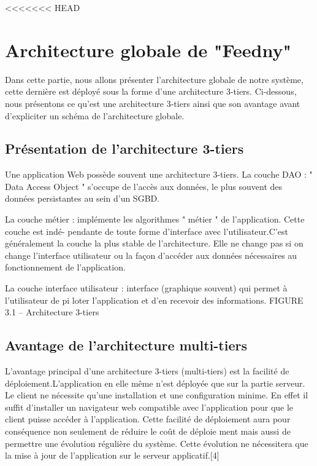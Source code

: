 <<<<<<< HEAD





\section{Architecture globale de "Feedny"}
Dans cette partie, nous allons présenter l'architecture globale de notre système, cette dernière est déployé sous la forme d'une architecture 3-tiers. Ci-dessous, nous présentons ce qu'est une architecture 3-tiers ainsi que son avantage avant d'expliciter un schéma de l'architecture globale.
\subsection{Présentation de l'architecture 3-tiers}

Une application Web possède souvent une architecture 3-tiers.
La couche DAO : " Data Access Object " s'occupe de l'accès aux données, le plus souvent des
données persistantes au sein d'un SGBD.

La couche métier : implémente les algorithmes " métier " de l'application. Cette couche est indé-
pendante de toute forme d'interface avec l'utilisateur.C'est généralement la couche la plus
stable de l'architecture. Elle ne change pas si on change l'interface utilisateur ou la façon
d'accéder aux données nécessaires au fonctionnement de l'application.

La couche interface utilisateur : interface (graphique souvent) qui permet à l'utilisateur de pi
loter l'application et d'en recevoir des informations.
FIGURE 3.1 – Architecture 3-tiers


\subsection{Avantage de l'architecture multi-tiers}
L'avantage principal d'une architecture 3-tiers (multi-tiers) est la facilité de déploiement.L'application
en elle même n'est déployée que sur la partie serveur.
Le client ne nécessite qu'une installation et une configuration minime.
En effet il suffit d'installer un navigateur web compatible avec l'application pour que le client
puisse accéder à l'application.
Cette facilité de déploiement aura pour conséquence non seulement de réduire le coût de déploie
ment mais aussi de permettre une évolution régulière du système. Cette évolution ne nécessitera
que la mise à jour de l'application sur le serveur applicatif.[4]




